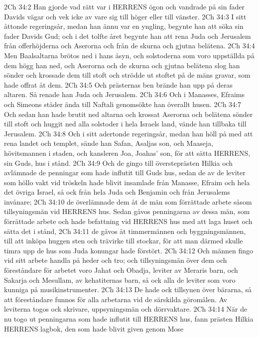 2Ch 34:2  Han gjorde vad rätt var i HERRENS ögon och vandrade på sin fader Davids vägar och vek icke av vare sig till höger eller till vänster.
2Ch 34:3  I sitt åttonde regeringsår, medan han ännu var en yngling, begynte han att söka sin fader Davids Gud; och i det tolfte året begynte han att rena Juda och Jerusalem från offerhöjderna och Aserorna och från de skurna och gjutna belätena.
2Ch 34:4  Men Baalsaltarna brötos ned i hans åsyn, och solstoderna som voro uppställda på dem högg han ned, och Aserorna och de skurna och gjutna belätena slog han sönder och krossade dem till stoft och strödde ut stoftet på de mäns gravar, som hade offrat åt dem.
2Ch 34:5  Och prästernas ben brände han upp på deras altaren. Så renade han Juda och Jerusalem.
2Ch 34:6  Och i Manasses, Efraims och Simeons städer ända till Naftali genomsökte han överallt husen.
2Ch 34:7  Och sedan han hade brutit ned altarna och krossat Aserorna och belätena sönder till stoft och huggit ned alla solstoder i hela Israels land, vände han tillbaka till Jerusalem.
2Ch 34:8  Och i sitt adertonde regeringsår, medan han höll på med att rena landet och templet, sände han Safan, Asaljas son, och Maaseja, hövitsmannen i staden, och kansleren Joa, Joahas' son, för att sätta HERRENS, sin Guds, hus i stånd.
2Ch 34:9  Och de gingo till översteprästen Hilkia och avlämnade de penningar som hade influtit till Guds hus, sedan de av de leviter som höllo vakt vid tröskeln hade blivit insamlade från Manasse, Efraim och hela det övriga Israel, så ock från hela Juda och Benjamin och från Jerusalems invånare;
2Ch 34:10  de överlämnade dem åt de män som förrättade arbete såsom tillsyningsmän vid HERRENS hus. Sedan gåvos penningarna av dessa män, som förrättade arbete och hade befattning vid HERRENS hus med att laga huset och sätta det i stånd,
2Ch 34:11  de gåvos åt timmermännen och byggningsmännen, till att inköpa huggen sten och trävirke till stockar, för att man därmed skulle timra upp de hus som Juda konungar hade förstört.
2Ch 34:12  Och männen fingo vid sitt arbete handla på heder och tro; och tillsyningsmän över dem och föreståndare för arbetet voro Jahat och Obadja, leviter av Meraris barn, och Sakarja och Mesullam, av kehatiternas barn, så ock alla de leviter som voro kunniga på musikinstrumenter.
2Ch 34:13  De hade ock tillsynen över bärarna, så att föreståndare funnos för alla arbetarna vid de särskilda göromålen. Av leviterna togos ock skrivare, uppsyningsmän och dörrvaktare.
2Ch 34:14  När de nu togo ut penningarna som hade influtit till HERRENS hus, fann prästen Hilkia HERRENS lagbok, den som hade blivit given genom Mose

